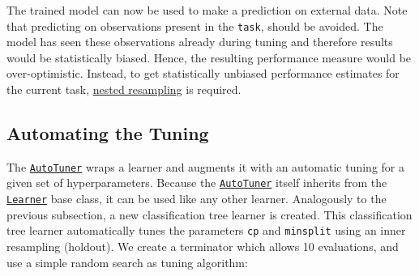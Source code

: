 \documentclass[
]{scrbook}
\newenvironment{Shaded}{\begin{snugshade}}{\end{snugshade}}
\newcommand{\FunctionTok}[1]{\textcolor[rgb]{0.00,0.00,0.00}{#1}}
\newcommand{\NormalTok}[1]{#1}
\newcommand{\OtherTok}[1]{\textcolor[rgb]{0.56,0.35,0.01}{#1}}
\newcommand{\SpecialCharTok}[1]{\textcolor[rgb]{0.00,0.00,0.00}{#1}}
\renewenvironment{Shaded} {\begin{snugshade}\small} {\end{snugshade}}
\begin{document}
\begin{Shaded}
\end{Shaded}

The trained model can now be used to make a prediction on external data.
Note that predicting on observations present in the \texttt{task}, should be avoided.
The model has seen these observations already during tuning and therefore results would be statistically biased.
Hence, the resulting performance measure would be over-optimistic.
Instead, to get statistically unbiased performance estimates for the current task, \protect\hyperlink{nested-resampling}{nested resampling} is required.

\hypertarget{autotuner}{%
\subsection{Automating the Tuning}\label{autotuner}}

The \href{https://mlr3tuning.mlr-org.com/reference/AutoTuner.html}{\texttt{AutoTuner}} wraps a learner and augments it with an automatic tuning for a given set of hyperparameters.
Because the \href{https://mlr3tuning.mlr-org.com/reference/AutoTuner.html}{\texttt{AutoTuner}} itself inherits from the \href{https://mlr3.mlr-org.com/reference/Learner.html}{\texttt{Learner}} base class, it can be used like any other learner.
Analogously to the previous subsection, a new classification tree learner is created.
This classification tree learner automatically tunes the parameters \texttt{cp} and \texttt{minsplit} using an inner resampling (holdout).
We create a terminator which allows 10 evaluations, and use a simple random search as tuning algorithm:
\end{document}
